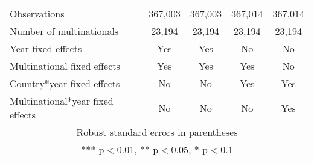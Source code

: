 \begin{longtable}{lcccc}
Observations & 367,003 & 367,003 & 367,014 & 367,014 \\
Number of multinationals & 23,194 & 23,194 & 23,194 & 23,194 \\
Year fixed effects & Yes & Yes & No & No \\
Multinational fixed effects & Yes & Yes & Yes & No \\
Country*year fixed effects & No & No & Yes & Yes \\
 Multinational*year fixed effects & No & No & No & Yes \\ \hline
\multicolumn{5}{c}{ Robust standard errors in parentheses} \\
\multicolumn{5}{c}{ *** p$<$0.01, ** p$<$0.05, * p$<$0.1} \\
\end{longtable}